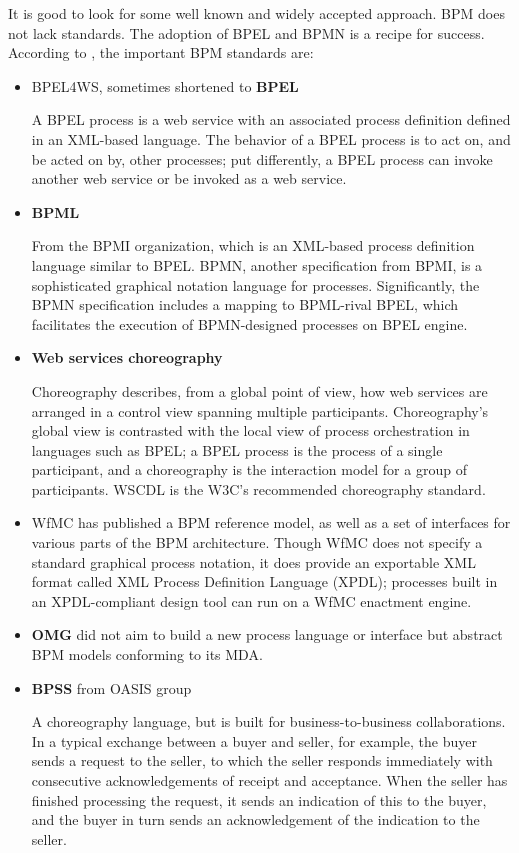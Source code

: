 	It is good to look for some well known and widely accepted approach. BPM does not lack standards. The adoption of
	\gls{BPEL} and \gls{BPMN} is a recipe for success. According to \cite[Ch.~1.3.1]{bpm}, the important BPM standards are:
	
	\begin{itemize}
		\item \gls{BPEL4WS}, sometimes shortened to \textbf{\gls{BPEL}}
		
		A BPEL process is a web service with an associated process definition defined in an XML-based language. The behavior
		of a BPEL process is to act on, and be acted on by, other processes; put differently, a BPEL process can invoke
		another web service or be invoked as a web service.
	  	\item \textbf{\gls{BPML}}
	  
		From the \gls{BPMI} organization, which is an XML-based process definition language similar to BPEL. BPMN, another
	  	specification from BPMI, is a sophisticated graphical notation language for processes. Significantly, the BPMN
	  	specification includes a mapping to BPML-rival BPEL, which facilitates the execution of BPMN-designed processes on
	  	BPEL engine.
	  	\item \textbf{Web services choreography}
	
	  	Choreography describes, from a global point of view, how web services are arranged in a control view spanning
	  	multiple participants. Choreography's global view is contrasted with the local view of process orchestration in
	  	languages such as BPEL; a BPEL process is the process of a single participant, and a choreography is the interaction
	  	model for a group of participants. \gls{WSCDL} is the W3C's recommended choreography standard.
	
	  	\item \gls{WfMC} has published a BPM reference model, as well as a set of interfaces for various parts of the BPM
	  	architecture. Though WfMC does not specify a standard graphical process notation, it does provide an exportable XML
	  	format called XML Process Definition Language (XPDL); processes built in an XPDL-compliant design tool can run on a
	  	WfMC enactment engine.
	  	
	  	\item \textbf{\gls{OMG}} did not aim to build a new process language or interface but abstract BPM models conforming
	  	to its \gls{MDA}.
	  	\item \textbf{\gls{BPSS}} from OASIS group

	  	A choreography language, but is built for business-to-business collaborations. In a typical exchange between a buyer
	  	and seller, for example, the buyer sends a request to the seller, to which the seller responds immediately with
	  	consecutive acknowledgements of receipt and acceptance. When the seller has finished processing the request, it
	  	sends an indication of this to the buyer, and the buyer in turn sends an acknowledgement of the indication to the
	  	seller.
	\end{itemize}
	
